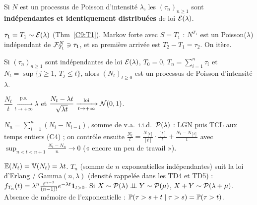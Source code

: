 \documentclass[11pt,a4paper]{article}
\begin{document}
\begin{theoreme}\label{C9:interarrivees}
Si $N$ est un processus de Poisson d'intensité $\lambda$, les $(\tau_n)_{n\ge1}$ sont \textbf{indépendantes et identiquement distribuées}
de loi $\mathcal{E}(\lambda)$.
\end{theoreme}
\begin{idee}
$\tau_1=T_1\sim\mathcal{E}(\lambda)$ (Thm~\ref{C9:T1}). Markov forte avec $S=T_1$ : $N^{T_1}$ est un Poisson($\lambda$) indépendant de
$\mathcal{F}^N_{T_1}\ni\tau_1$, et sa première arrivée est $T_2-T_1=\tau_2$. On itère.
\end{idee}

\begin{theoreme}\label{C9:construction}
Si $(\tau_n)_{n\ge1}$ sont indépendantes de loi $\mathcal{E}(\lambda)$, $T_0=0$, $T_n=\sum_{i=1}^n\tau_i$ et $N_t=\sup\{j\ge1,\ T_j\le t\}$, alors
$(N_t)_{t\ge0}$ est un processus de Poisson d'intensité $\lambda$.
\end{theoreme}

\begin{theoreme}\label{C9:asympt}
$\dfrac{N_t}{t}\xrightarrow[t\to+\infty]{\text{p.s.}}\lambda$ \quad et \quad
$\dfrac{N_t-\lambda t}{\sqrt{\lambda t}}\xrightarrow[t\to+\infty]{\text{loi}}\mathcal{N}(0,1)$.
\end{theoreme}
\begin{idee}
$N_n=\sum_{i=1}^n(N_i-N_{i-1})$, somme de v.a.\ i.i.d.\ $\mathcal{P}(\lambda)$ : LGN puis TCL aux temps entiers (C4) ; on contrôle ensuite
$\frac{N_t}{t}=\frac{N_{[t]}}{[t]}\cdot\frac{[t]}{t}+\frac{N_t-N_{[t]}}{t}$ avec $\sup_{n<t<n+1}\frac{N_t-N_n}{n}\to0$ (« encore un peu de travail »).
\end{idee}

\begin{horscours}\label{C9:hc}
$\mathbb{E}(N_t)=\operatorname{\mathbb{V}}(N_t)=\lambda t$. $T_n$ (somme de $n$ exponentielles indépendantes) suit la loi d'Erlang / Gamma$(n,\lambda)$ (densité rappelée dans les TD4 et TD5) :
$f_{T_n}(t)=\lambda^n\frac{t^{n-1}}{(n-1)!}e^{-\lambda t}\mathbf{1}_{t>0}$. Si $X\sim\mathcal{P}(\lambda)\perp\!\!\!\perp Y\sim\mathcal{P}(\mu)$, $X+Y\sim\mathcal{P}(\lambda+\mu)$.
Absence de mémoire de l'exponentielle : $\mathbb{P}(\tau>s+t\mid\tau>s)=\mathbb{P}(\tau>t)$.
\end{horscours}
\end{document}
